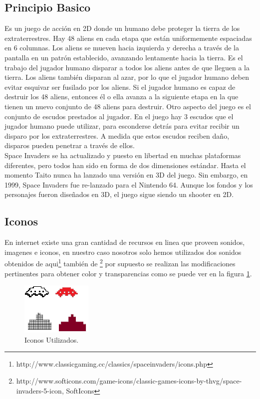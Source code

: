 \documentclass[a4paper]{article} %
\begin{document}
\subsection{Principio Basico}
Es un juego de acción en 2D donde un humano debe proteger la tierra de los extraterrestres. Hay 48 aliens en cada etapa que están uniformemente espaciadas en 6 columnas. Los aliens se mueven hacia izquierda y derecha a través de la pantalla en un patrón establecido, avanzando lentamente hacia la tierra. Es el trabajo del jugador humano disparar a todos los aliens antes de que lleguen a la tierra. Los aliens también disparan al azar, por lo que el jugador humano deben evitar esquivar ser fusilado por los aliens. Si el jugador humano es capaz de destruir los 48 aliens, entonces él o ella avanza a la siguiente etapa en la que tienen un nuevo conjunto de 48 aliens para destruir. Otro aspecto del juego es el conjunto de escudos prestados al jugador. En el juego hay 3 escudos que el jugador humano puede utilizar, para  esconderse detrás para evitar recibir un disparo por los extraterrestres. A medida que estos escudos reciben daño, disparos pueden penetrar a través de ellos.\\

Space Invaders se ha actualizado y puesto en libertad en muchas plataformas diferentes, pero todos han sido en forma de dos dimensiones estándar. Hasta el momento Taito nunca ha lanzado una versión en 3D del juego. Sin embargo, en 1999, Space Invaders fue re-lanzado para el Nintendo 64. Aunque los fondos y los personajes fueron diseñados en 3D, el juego sigue siendo un shooter en 2D.

\subsection{Iconos}
En internet existe una gran cantidad de recursos en linea que proveen sonidos, imagenes e iconos, en nuestro caso nosotros solo hemos utilizados dos sonidos obtenidos de aqui\footnote{http://www.classicgaming.cc/classics/spaceinvaders/icons.php} también de \footnote{http://www.softicons.com/game-icons/classic-games-icons-by-thvg/space-invaders-5-icon, SoftIcons} por supuesto se realizan las modificaciones pertinentes para obtener color y transparencias como se puede ver en la figura \ref{fig:iconos}.

\begin{figure}
  \centering
    \includegraphics[scale=0.5]{images/iconos}
  \caption{Iconos Utilizados.}
  \label{fig:iconos}
\end{figure}
\end{document}
